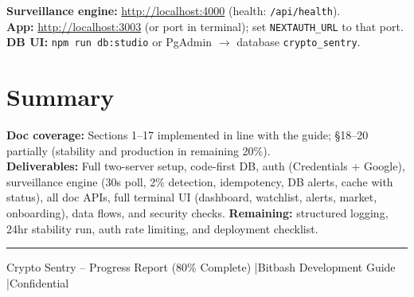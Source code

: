 \documentclass[11pt,a4paper]{report}
\begin{document}
\textbf{Surveillance engine:} \url{http://localhost:4000} (health: \texttt{/api/health}). \\
\textbf{App:} \url{http://localhost:3003} (or port in terminal); set \texttt{NEXTAUTH\_URL} to that port. \\
\textbf{DB UI:} \texttt{npm run db:studio} or PgAdmin $\to$ database \texttt{crypto\_sentry}.

\chapter{Summary}

\begin{summarybox}
\textbf{Doc coverage:} Sections 1--17 implemented in line with the guide; \S18--20 partially (stability and production in remaining 20\%).\\
\vspace{0.5em}
\textbf{Deliverables:} Full two-server setup, code-first DB, auth (Credentials + Google), surveillance engine (30s poll, 2\% detection, idempotency, DB alerts, cache with status), all doc APIs, full terminal UI (dashboard, watchlist, alerts, market, onboarding), data flows, and security checks. \textbf{Remaining:} structured logging, 24hr stability run, auth rate limiting, and deployment checklist.
\end{summarybox}

\vfill
\hrule
\small\centering Crypto Sentry -- Progress Report (80\% Complete) \quad|\quad Bitbash Development Guide \quad|\quad Confidential
\end{document}
